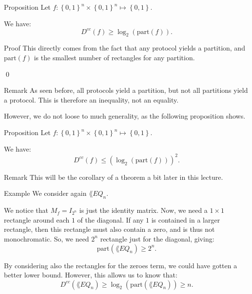 \documentclass[a4paper]{article}
\begin{document}
\begin{parag}{Proposition}
    Let $f: \left\{0, 1\right\}^n \times \left\{0, 1\right\}^n \mapsto \left\{0, 1\right\}$.

    We have:
    \[D^{cc}\left(f\right) \geq \log_2\left(\text{part}\left(f\right)\right).\]

    \begin{subparag}{Proof}
        This directly comes from the fact that any protocol yields a partition, and $\text{part}\left(f\right)$ is the smallest number of rectangles for any partition.

        \qed
    \end{subparag}
    
    \begin{subparag}{Remark}
        As seen before, all protocols yield a partition, but not all partitions yield a protocol. This is therefore an inequality, not an equality.

        However, we do not loose to much generality, as the following proposition shows.
    \end{subparag}
\end{parag}

\begin{parag}{Proposition}
    Let $f: \left\{0, 1\right\}^n \times \left\{0, 1\right\}^n \mapsto \left\{0, 1\right\}$.

    We have:
    \[D^{cc}\left(f\right) \leq \left(\log_2\left(\text{part}\left(f\right)\right)\right)^2.\]

    \begin{subparag}{Remark}
        This will be the corollary of a theorem a bit later in this lecture.
    \end{subparag}
\end{parag}

\begin{parag}{Example}
    We consider again $\lang{EQ}_n$.

    We notice that $M_f = I_{2^n}$ is just the identity matrix. Now, we need a $1 \times 1$ rectangle around each $1$ of the diagonal. If any $1$ is contained in a larger rectangle, then this rectangle must also contain a zero, and is thus not monochromatic. So, we need $2^n$ rectangle just for the diagonal, giving: 
    \[\text{part}\left(\lang{EQ}_n\right) \geq 2^n.\]

    By considering also the rectangles for the zeroes term, we could have gotten a better lower bound. However, this allows us to know that: 
    \[D^{cc}\left(\lang{EQ}_n\right) \geq \log_2\left(\text{part}\left(\lang{EQ}_n\right)\right) \geq n.\]
\end{parag}
\end{document}
